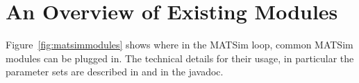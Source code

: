 %




\section{An Overview of Existing Modules}
Figure~\ref{fig:matsimmodules} shows where in the MATSim loop, common MATSim modules can be plugged in. The technical details for their usage, in particular the parameter sets are described in \citep[][]{MATSim_Userguide_2014} and in the javadoc.

